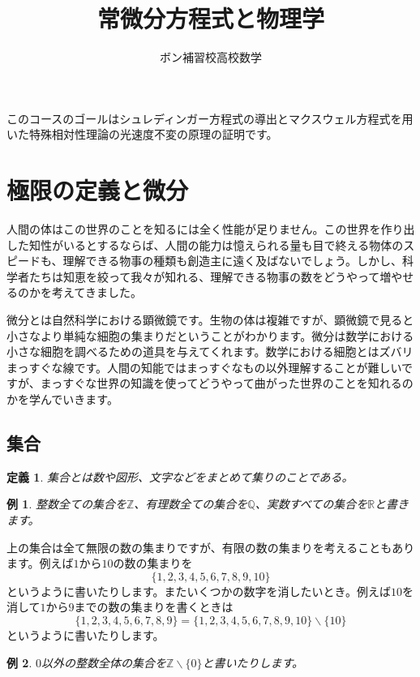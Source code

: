 \documentclass{ltjsarticle}
\title{常微分方程式と物理学}
\author{ボン補習校高校数学}
\date{}
\newtheorem{definition}{定義}[section]
\newtheorem{example}{例}[section]
\newcommand*{\Z}{\mathbb{Z}}
\newcommand*{\Q}{\mathbb{Q}}
\newcommand*{\R}{\mathbb{R}}
\begin{document}
\maketitle


このコースのゴールはシュレディンガー方程式の導出とマクスウェル方程式を用いた特殊相対性理論の光速度不変の原理の証明です。

\section{極限の定義と微分}
人間の体はこの世界のことを知るには全く性能が足りません。この世界を作り出した知性がいるとするならば、人間の能力は憶えられる量も目で終える物体のスピードも、理解できる物事の種類も創造主に遠く及ばないでしょう。しかし、科学者たちは知恵を絞って我々が知れる、理解できる物事の数をどうやって増やせるのかを考えてきました。
\par 微分とは自然科学における顕微鏡です。生物の体は複雑ですが、顕微鏡で見ると小さなより単純な細胞の集まりだということがわかります。微分は数学における小さな細胞を調べるための道具を与えてくれます。数学における細胞とはズバリまっすぐな線です。人間の知能ではまっすぐなもの以外理解することが難しいですが、まっすぐな世界の知識を使ってどうやって曲がった世界のことを知れるのかを学んでいきます。
\subsection{集合}

\begin{definition}
集合とは数や図形、文字などをまとめて集りのことである。
\end{definition}

\begin{example}
整数全ての集合を$\Z$、有理数全ての集合を$\Q$、実数すべての集合を$\R$と書きます。
\end{example}

上の集合は全て無限の数の集まりですが、有限の数の集まりを考えることもあります。例えば$1$から$10$の数の集まりを
\begin{equation*}
\{1,2,3,4,5,6,7,8,9,10\}
\end{equation*}
というように書いたりします。またいくつかの数字を消したいとき。例えば$10$を消して$1$から$9$までの数の集まりを書くときは
\begin{equation*}
\{1,2,3,4,5,6,7,8,9\}=\{1,2,3,4,5,6,7,8,9,10\}\backslash\{10\}
\end{equation*}
というように書いたりします。
\begin{example}
$0$以外の整数全体の集合を$\Z\backslash\{0\}$と書いたりします。
\end{example}
\end{document}
